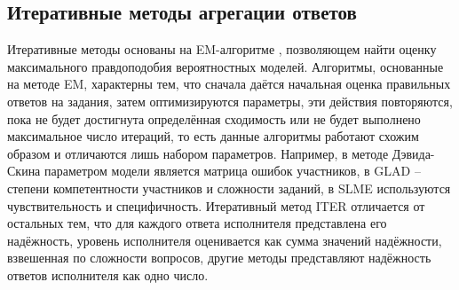 \documentclass[specification,annotation,times]{itmo-student-thesis}
\begin{document}
\subsection{Итеративные методы агрегации ответов}
Итеративные методы основаны на EM-алгоритме \cite{moon1996expectation}, позволяющем найти оценку максимального правдоподобия вероятностных моделей. Алгоритмы, основанные на методе EM, характерны тем, что сначала даётся начальная оценка правильных ответов на задания, затем оптимизируются параметры, эти действия повторяются, пока не будет достигнута определённая сходимость или не будет выполнено максимальное число итераций, то есть данные алгоритмы работают схожим образом и отличаются лишь набором параметров. Например, в методе Дэвида-Скина \cite{dawid1979maximum} параметром модели является матрица ошибок участников, в GLAD \cite{whitehill2009whose} -- степени компетентности участников и сложности заданий, в SLME \cite{raykar2009supervised} используются чувствительность и специфичность. Итеративный метод ITER \cite{karger2011iterative} отличается от остальных тем, что для каждого ответа исполнителя представлена его надёжность, уровень исполнителя оценивается как сумма значений надёжности, взвешенная по сложности вопросов, другие методы представляют надёжность ответов исполнителя как одно число.
\end{document}

